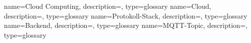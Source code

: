 {
    name=Cloud Computing,
    description={},
    type=glossary
}
{
    name=Cloud,
    description={},
    type=glossary
}
{
    name=Protokoll-Stack,
    description={},
    type=glossary
}
{
    name=Backend,
    description={},
    type=glossary
}
{
    name=MQTT-Topic,
    description={},
    type=glossary
}